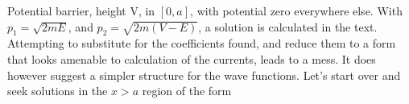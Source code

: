 \documentclass{article}
\begin{document}
%
%
%
%

Potential barrier, height V, in $[0,a]$, with potential zero everywhere else.  With $p_1 = \sqrt{2mE}$, and $p_2 = \sqrt{2m(V-E)}$, a
solution is calculated in the text.  Attempting to substitute for the coefficients found, and reduce them to a form
that looks amenable to calculation of the currents, leads to a mess.  It does however suggest a simpler structure for the 
wave functions.  Let's start over and seek solutions in the $x>a$ region of the form
\end{document}

